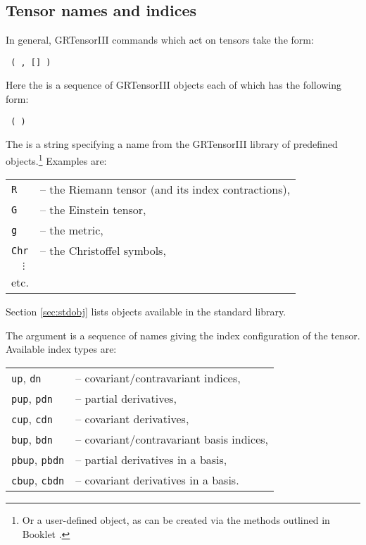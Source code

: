 \documentclass{article}
\begin{document}
\subsection{Tensor names and indices}
%
In general, GRTensorIII commands which act on tensors take the form:
\begin{center}
  \texttt{  ( ,
    [] )}
\end{center}
Here the  is a sequence of GRTensorIII objects each of
which has the following form:
\begin{center}
  \texttt{  (  )}
\end{center}

The  is a string specifying a name from the
GRTensorIII library of predefined objects.\footnote{Or a user-defined
object, as can be created via the methods outlined in Booklet
\grDefRef.} Examples are:
\begin{center}
  \begin{tabular}{ll}
    \texttt{R} & -- the Riemann tensor (and its index contractions),\\
    \texttt{G} & -- the Einstein tensor, \\
    \texttt{g} & -- the metric, \\
    \texttt{Chr} & -- the Christoffel symbols, \\
    $\quad\vdots$ & \\
    etc. &
  \end{tabular}
\end{center}
Section \ref{sec:stdobj} lists objects available in the standard library.

The argument  is a sequence of names giving the index
configuration of the tensor. Available index types are:
\begin{center}
  \begin{tabular}{ll}
    \texttt{up}, \texttt{dn} & -- covariant/contravariant indices,\\
    \texttt{pup}, \texttt{pdn} & -- partial derivatives,\\
    \texttt{cup}, \texttt{cdn} & -- covariant derivatives,\\
    \texttt{bup}, \texttt{bdn} & -- covariant/contravariant basis indices,\\
    \texttt{pbup}, \texttt{pbdn} & -- partial derivatives in a basis,\\
    \texttt{cbup}, \texttt{cbdn} & -- covariant derivatives in a basis.\\
  \end{tabular}
\end{center}
\end{document}
